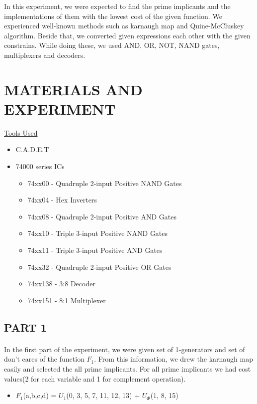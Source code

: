 \documentclass[pdftex,12pt,a4paper]{article}
\begin{document}
In this experiment, we were expected to find the prime implicants and the implementations of them with the lowest cost of the given function. We experienced well-known methods such as karnaugh map and Quine-McCluskey algorithm. Beside that, we converted given expressions each other with the given constrains. While doing these, we used AND, OR, NOT, NAND gates, multiplexers and decoders.

\section{MATERIALS AND EXPERIMENT}
\underline{Tools Used}
\begin{itemize}
    \item C.A.D.E.T
    \item 74000 series ICs
    \begin{itemize}
        \item 74xx00 - Quadruple 2-input Positive NAND Gates
        \item 74xx04 - Hex Inverters     
        \item 74xx08 - Quadruple 2-input Positive AND Gates
        \item 74xx10 - Triple 3-input Positive NAND Gates
        \item 74xx11 - Triple 3-input Positive AND Gates
        \item 74xx32 - Quadruple 2-input Positive OR Gates
        \item 74xx138 - 3:8 Decoder
        \item 74xx151 - 8:1 Multiplexer
    \end{itemize}
\end{itemize}
\clearpage
\subsection{PART 1}
\paragraph{}
In the first part of the experiment, we were given set of 1-generators and set of don't cares of the function $F_{1}$. From this information, we drew the karnaugh map easily and selected the all prime implicants. For all prime implicants we had cost values(2 for each variable and 1 for complement operation).


\begin{itemize}
    \item $F_{1}$(a,b,c,d) = $U_{1}$(0, 3, 5, 7, 11, 12, 13) + $U_{\Phi}$(1, 8, 15)  
\end{itemize}
\end{document}
